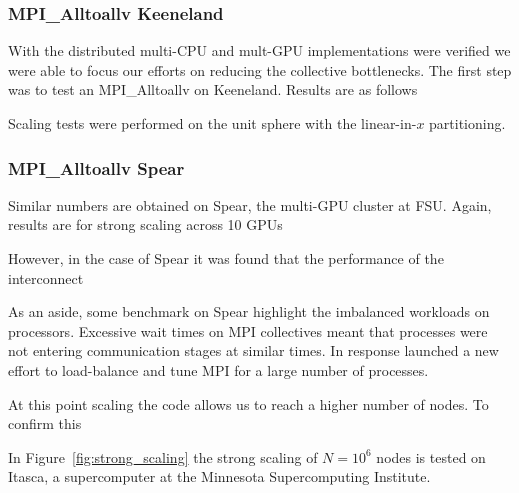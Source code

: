 \documentclass{report}
\begin{document}
\subsubsection{MPI\_Alltoallv Keeneland}
With the distributed multi-CPU and mult-GPU implementations were verified we were able to focus our efforts on reducing the collective bottlenecks. The first step was to test an MPI\_Alltoallv on Keeneland. Results are as follows

Scaling tests were performed on the unit sphere with the linear-in-$x$ partitioning. 



\subsubsection{MPI\_Alltoallv Spear}
Similar numbers are obtained on Spear, the multi-GPU cluster at FSU. Again, results are for strong scaling across 10 GPUs

However, in the case of Spear it was found that the performance of the interconnect


As an aside, some benchmark on Spear highlight the imbalanced workloads on processors. Excessive wait times on MPI collectives meant that processes were not entering communication stages at similar times. In response launched a new effort to load-balance and tune MPI for a large number of processes.

At this point scaling the code allows us to reach a higher number of nodes. To confirm this  




%


In Figure~\ref{fig:strong_scaling} the strong scaling of $N=10^6$ nodes is tested on Itasca, a supercomputer at the Minnesota Supercomputing Institute.   
\end{document}
